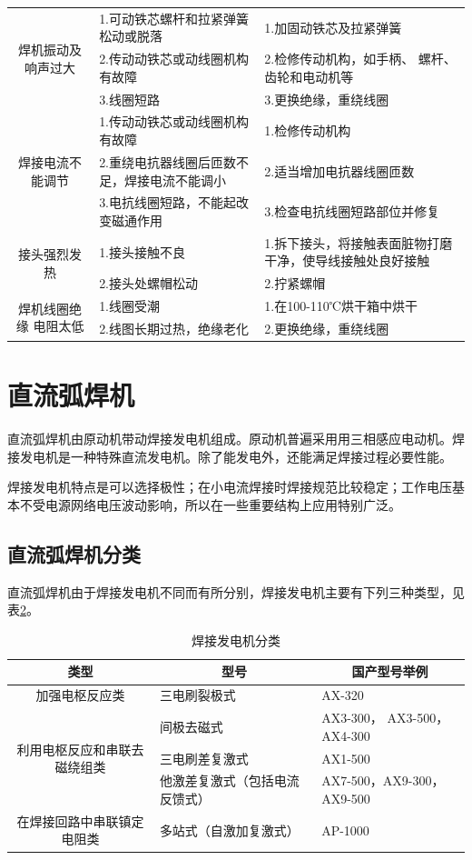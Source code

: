 \documentclass{ctexbook}
\begin{document}
\begin{table}[htbp]
\begin{tabular}{c|l|l}
		\midrule
		\multirow{3}[6]{*}{焊机振动及响声过大} & 1.可动铁芯螺杆和拉紧弹簧松动或脱落 & 1.加固动铁芯及拉紧弹簧   \\
		\cmidrule{2-3}          & 2.传动动铁芯或动线圈机构有故障 & 2.检修传动机构，如手柄、 螺杆、齿轮和电动机等 \\
		\cmidrule{2-3}          & 3.线圈短路 & 3.更换绝缘，重绕线圈 \\
		\midrule
		\multirow{3}[6]{*}{焊接电流不能调节} & 1.传动动铁芯或动线圈机构有故障 & 1.检修传动机构   \\
		\cmidrule{2-3}          & 2.重绕电抗器线圈后匝数不足，焊接电流不能调小 & 2.适当增加电抗器线圈匝数 \\
		\cmidrule{2-3}          & 3.电抗线圈短路，不能起改变磁通作用 & 3.检查电抗线圈短路部位并修复 \\
		\midrule
		\multirow{2}[4]{*}{接头强烈发热} & 1.接头接触不良 & 1.拆下接头，将接触表面脏物打磨干净，使导线接触处良好接触  \\
		\cmidrule{2-3}          & 2.接头处螺帽松动 & 2.拧紧螺帽 \\
		\midrule
		\multirow{2}[4]{*}{焊机线圈绝缘 电阻太低} & 1.线圈受潮  & 1.在100-110℃烘干箱中烘干 \\
		\cmidrule{2-3}          & 2.线图长期过热，绝缘老化 & 2.更换绝缘，重绕线圈 \\
		\bottomrule
	\end{tabular}%
	\label{tab:hanjibianyaqichangjianguzhang}%
\end{table}%
\section{直流弧焊机}
直流弧焊机由原动机带动焊接发电机组成。原动机普遍采用用三相感应电动机。焊接发电机是一种特殊直流发电机。除了能发电外，还能满足焊接过程必要性能。

焊接发电机特点是可以选择极性；在小电流焊接时焊接规范比较稳定；工作电压基本不受电源网络电压波动影响，所以在一些重要结构上应用特别广泛。
\subsection{直流弧焊机分类}
直流弧焊机由于焊接发电机不同而有所分别，焊接发电机主要有下列三种类型，见表\ref{tab:hanjiefadianjifenlei}。
\begin{table}[htbp]
	\centering
	\caption{焊接发电机分类}
	\begin{tabular}{c|l|l}
		\hline
		类型    & \multicolumn{1}{c}{型号} & \multicolumn{1}{c}{国产型号举例} \\ \hline
		加强电枢反应类 & 三电刷裂极式 & AX-320 \\ \hline
		\multirow{3}[0]{*}{利用电枢反应和串联去磁绕组类} & 间极去磁式 & AX3-300， AX3-500，AX4-300 \\ \hline
		& 三电刷差复激式 & AX1-500 \\ \hline
		& 他激差复激式（包括电流 反馈式） & AX7-500，AX9-300，AX9-500 \\ \hline
		在焊接回路中串联镇定电阻类 & 多站式（自激加复激式） & AP-1000 \\ \hline
	\end{tabular}%
	\label{tab:hanjiefadianjifenlei}%
\end{table}%
\end{document}
